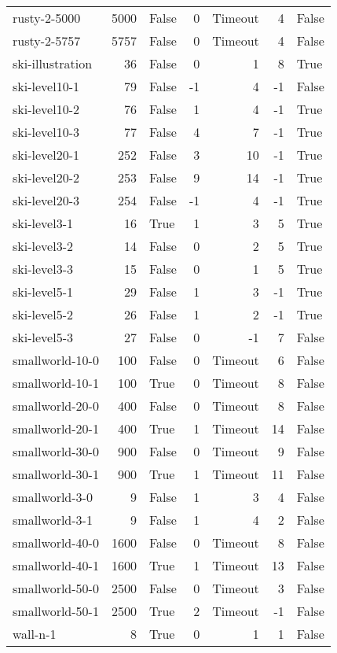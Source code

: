 \begin{longtable}{lrlrrrl}
rusty-2-5000 & 5000 & False & 0 & Timeout & 4 & False \\
rusty-2-5757 & 5757 & False & 0 & Timeout & 4 & False \\
ski-illustration & 36 & False & 0 & 1 & 8 & True \\
ski-level10-1 & 79 & False & -1 & 4 & -1 & False \\
ski-level10-2 & 76 & False & 1 & 4 & -1 & True \\
ski-level10-3 & 77 & False & 4 & 7 & -1 & True \\
ski-level20-1 & 252 & False & 3 & 10 & -1 & True \\
ski-level20-2 & 253 & False & 9 & 14 & -1 & True \\
ski-level20-3 & 254 & False & -1 & 4 & -1 & True \\
ski-level3-1 & 16 & True & 1 & 3 & 5 & True \\
ski-level3-2 & 14 & False & 0 & 2 & 5 & True \\
ski-level3-3 & 15 & False & 0 & 1 & 5 & True \\
ski-level5-1 & 29 & False & 1 & 3 & -1 & True \\
ski-level5-2 & 26 & False & 1 & 2 & -1 & True \\
ski-level5-3 & 27 & False & 0 & -1 & 7 & False \\
smallworld-10-0 & 100 & False & 0 & Timeout & 6 & False \\
smallworld-10-1 & 100 & True & 0 & Timeout & 8 & False \\
smallworld-20-0 & 400 & False & 0 & Timeout & 8 & False \\
smallworld-20-1 & 400 & True & 1 & Timeout & 14 & False \\
smallworld-30-0 & 900 & False & 0 & Timeout & 9 & False \\
smallworld-30-1 & 900 & True & 1 & Timeout & 11 & False \\
smallworld-3-0 & 9 & False & 1 & 3 & 4 & False \\
smallworld-3-1 & 9 & False & 1 & 4 & 2 & False \\
smallworld-40-0 & 1600 & False & 0 & Timeout & 8 & False \\
smallworld-40-1 & 1600 & True & 1 & Timeout & 13 & False \\
smallworld-50-0 & 2500 & False & 0 & Timeout & 3 & False \\
smallworld-50-1 & 2500 & True & 2 & Timeout & -1 & False \\
wall-n-1 & 8 & True & 0 & 1 & 1 & False \\

\end{longtable}
